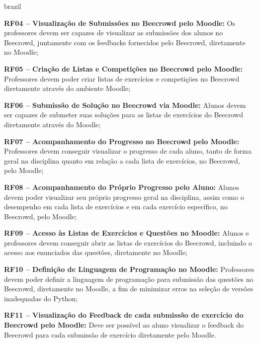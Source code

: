 \begin{otherlanguage*}{brazil}
\vspace{12pt}

\textbf{RF04 – Visualização de Submissões no Beecrowd pelo Moodle:} Os professores devem ser capazes de visualizar as submissões dos alunos no Beecrowd, juntamente com os feedbacks fornecidos pelo Beecrowd, diretamente no Moodle;

\vspace{12pt}

\textbf{RF05 – Criação de Listas e Competições no Beecrowd pelo Moodle:} Professores devem poder criar listas de exercícios e competições no Beecrowd diretamente através do ambiente Moodle;

\vspace{12pt}

\textbf{RF06 – Submissão de Solução no Beecrowd via Moodle:} Alunos devem ser capazes de submeter suas soluções para as listas de exercícios do Beecrowd diretamente através do Moodle;

\vspace{12pt}

\textbf{RF07 – Acompanhamento do Progresso no Beecrowd pelo Moodle:} Professores devem conseguir visualizar o progresso de cada aluno, tanto de forma geral na disciplina quanto em relação a cada lista de exercícios, no Beecrowd, pelo Moodle;

\vspace{12pt}

\textbf{RF08 – Acompanhamento do Próprio Progresso pelo Aluno:} Alunos devem poder visualizar seu próprio progresso geral na disciplina, assim como o desempenho em cada lista de exercícios e em cada exercício específico, no Beecrowd, pelo Moodle;

\vspace{12pt}

\textbf{RF09 – Acesso às Listas de Exercícios e Questões no Moodle:} Alunos e professores devem conseguir abrir as listas de exercícios do Beecrowd, incluindo o acesso aos enunciados das questões, diretamente no Moodle;

\vspace{12pt}

\textbf{RF10 – Definição de Linguagem de Programação no Moodle:} Professores devem poder definir a linguagem de programação para submissão das questões no Beecrowd, diretamente no Moodle, a fim de minimizar erros na seleção de versões inadequadas do Python;

\vspace{12pt}

\textbf{RF11 – Visualização do Feedback de cada submissão de exercício do Beecrowd pelo Moodle:} Deve ser possível ao aluno visualizar o feedback do Beecrowd para cada submissão de exercício diretamente pelo Moodle.

\end{otherlanguage*}

